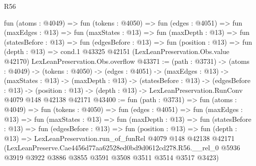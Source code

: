 \begin{lexlean}{R56}
\begin{coremodule}
  fun (atoms : @4049) =>
  fun (tokens : @4050) =>
  fun (edges : @4051) =>
  fun (maxEdges : @13) =>
  fun (maxStates : @13) =>
  fun (maxDepth : @13) =>
  fun (statesBefore : @13) =>
  fun (edgesBefore : @13) =>
  fun (position : @13) =>
  fun (depth : @13) =>
  cond.{1} @43325 @42151 (LexLeanPreservation.Obs.value @42170) LexLeanPreservation.Obs.overflow
@43371 := (path : @3731) ->
  (atoms : @4049) ->
  (tokens : @4050) ->
  (edges : @4051) ->
  (maxEdges : @13) ->
  (maxStates : @13) ->
  (maxDepth : @13) ->
  (statesBefore : @13) ->
  (edgesBefore : @13) ->
  (position : @13) -> (depth : @13) -> LexLeanPreservation.RunConv @4079 @148 @42138 @42171
@43400 := fun (path : @3731) =>
  fun (atoms : @4049) =>
  fun (tokens : @4050) =>
  fun (edges : @4051) =>
  fun (maxEdges : @13) =>
  fun (maxStates : @13) =>
  fun (maxDepth : @13) =>
  fun (statesBefore : @13) =>
  fun (edgesBefore : @13) =>
  fun (position : @13) =>
  fun (depth : @13) =>
  LexLeanPreservation.run_of_funRel
    @4079
    @148
    @42138
    @42171
    (LexLeanPreserve.Cae4456d77aa62528ed0bd9d0612cd278.R56.__rel_0
      @5936
      @3919
      @3922
      @3886
      @3855
      @3591
      @3508
      @3511
      @3514
      @3517
      @3423)
\end{coremodule}
\end{lexlean}
